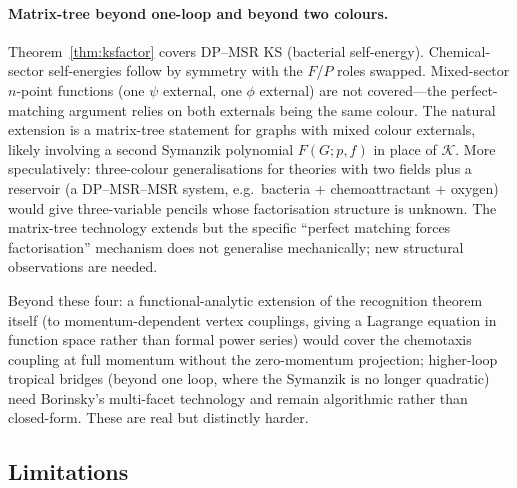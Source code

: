\documentclass[11pt,a4paper]{article}
\theoremstyle{plain}
\begin{document}
\paragraph{Matrix-tree beyond one-loop and beyond two colours.}
Theorem~\ref{thm:ksfactor} covers DP--MSR KS (bacterial
self-energy).  Chemical-sector self-energies follow by symmetry
with the $F$/$P$ roles swapped.  Mixed-sector $n$-point functions
(one $\psi$ external, one $\phi$ external) are not covered---the
perfect-matching argument relies on both externals being the
same colour.  The natural extension is a matrix-tree statement
for graphs with mixed colour externals, likely involving a
second Symanzik polynomial $F(G; p, f)$ in place of $\mathcal K$.
More speculatively: three-colour generalisations for theories
with two fields plus a reservoir (a DP--MSR--MSR system, e.g.\
bacteria + chemoattractant + oxygen) would give three-variable
pencils whose factorisation structure is unknown.  The
matrix-tree technology extends but the specific ``perfect
matching forces factorisation'' mechanism does not generalise
mechanically; new structural observations are needed.

Beyond these four: a functional-analytic extension of the
recognition theorem itself (to momentum-dependent vertex
couplings, giving a Lagrange equation in function space rather
than formal power series) would cover the chemotaxis coupling at
full momentum without the zero-momentum projection; higher-loop
tropical bridges (beyond one loop, where the Symanzik is no
longer quadratic) need Borinsky's multi-facet technology and
remain algorithmic rather than closed-form.  These are real but
distinctly harder.

\subsection{Limitations}
\label{sec:limitations}
\end{document}
